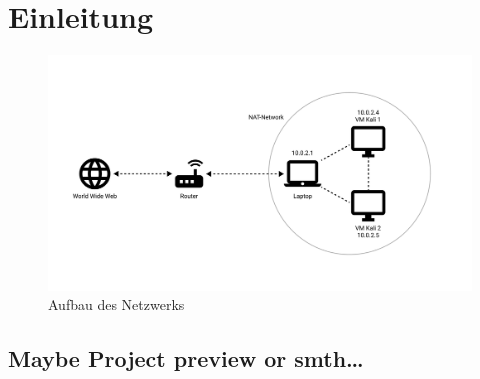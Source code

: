 \chapter{Einleitung}

\begin{figure}
    \includegraphics[width=\linewidth]{img/network_fig.png}
    \caption{Aufbau des Netzwerks}
    \label{fig:network}
\end{figure}
\section*{Maybe Project preview or smth…}
